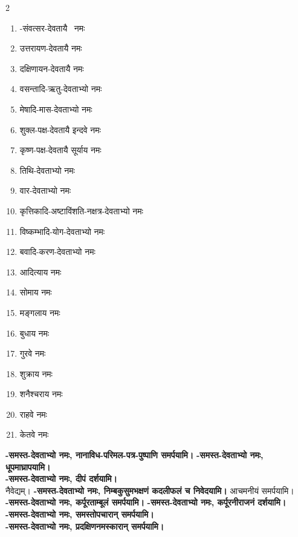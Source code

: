 \begin{multicols}{2}
\setlength\columnsep{0pt}
\begin{enumerate}
\item \yname-संवत्सर-देवतायै \devataayai{}~नमः
\item उत्तरायण-देवतायै नमः
\item दक्षिणायन-देवतायै नमः
\item वसन्तादि-ऋतु-देवताभ्यो नमः
\item मेषादि-मास-देवताभ्यो नमः
\item शुक्ल-पक्ष-देवतायै इन्दवे नमः
\item कृष्ण-पक्ष-देवतायै सूर्याय नमः
\item तिथि-देवताभ्यो नमः
\item वार-देवताभ्यो नमः
\item कृत्तिकादि-अष्टाविंशति-नक्षत्र-देवताभ्यो नमः
\item विष्कम्भादि-योग-देवताभ्यो नमः
\item बवादि-करण-देवताभ्यो नमः
\item आदित्याय नमः
\item सोमाय नमः
\item मङ्गलाय नमः
\item बुधाय नमः
\item गुरवे नमः
\item शुक्राय नमः
\item शनैश्चराय नमः
\item राहवे नमः
\item केतवे नमः
\end{enumerate}
\end{multicols}

\textbf{\devataadi-समस्त-देवताभ्यो नमः, नानाविध-परिमल-पत्र-पुष्पाणि समर्पयामि।}
\textbf{\devataadi-समस्त-देवताभ्यो नमः, धूपमाघ्रापयामि।}\\
\textbf{\devataadi-समस्त-देवताभ्यो नमः, दीपं दर्शयामि।}\\
नैवेद्यम्। \textbf{\devataadi-समस्त-देवताभ्यो नमः, निम्बकुसुमभक्षणं कदलीफलं च निवेदयामि।} आचमनीयं समर्पयामि।\\
\textbf{\devataadi-समस्त-देवताभ्यो नमः, कर्पूरताम्बूलं समर्पयामि।} \textbf{\devataadi-समस्त-देवताभ्यो नमः, कर्पूरनीराजनं दर्शयामि।}\\
\textbf{\devataadi-समस्त-देवताभ्यो नमः, समस्तोपचारान् समर्पयामि।}\\

\textbf{\devataadi-समस्त-देवताभ्यो नमः, प्रदक्षिणनमस्कारान् समर्पयामि।}\\

